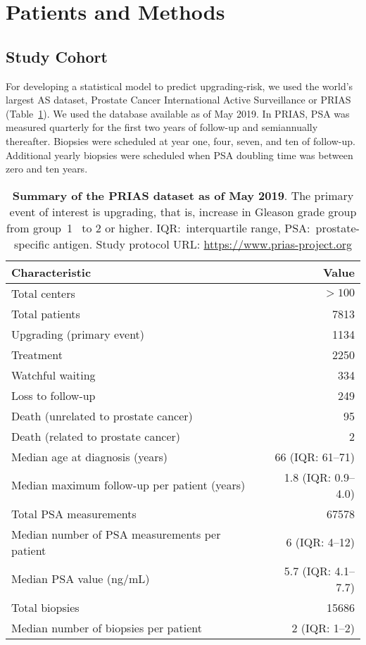 \section{Patients and Methods}
\subsection{Study Cohort}
\label{subsec:cohort}
For developing a statistical model to predict upgrading-risk, we used the world's largest AS dataset, Prostate Cancer International Active Surveillance or PRIAS~\citep{bul2013active} (Table~\ref{table:prias_summary}). We used the database available as of May 2019. In PRIAS, PSA was measured quarterly for the first two years of follow-up and semiannually thereafter. Biopsies were scheduled at year one, four, seven, and ten of follow-up. Additional yearly biopsies were scheduled when PSA doubling time was between zero and ten years.

\begin{table}
\small\sf\centering
\caption{\textbf{Summary of the PRIAS dataset as of May 2019}. The primary event of interest is upgrading, that is, increase in Gleason grade group from group~1~\citep{epsteinGG2014} to 2 or higher. IQR:~interquartile range, PSA:~prostate-specific antigen. Study protocol URL: \url{https://www.prias-project.org}}
\label{table:prias_summary}
\begin{tabular}{lr}
\toprule
\textbf{Characteristic} & \textbf{Value}\\
\midrule
Total centers & $> 100$\\
Total patients & 7813\\
Upgrading (primary event) & 1134\\
Treatment & 2250\\
Watchful waiting & 334\\
Loss to follow-up & 249\\
Death (unrelated to prostate cancer) & 95\\
Death (related to prostate cancer) & 2\\
\midrule
Median age at diagnosis (years) & 66 (IQR: 61--71)\\
Median maximum follow-up per patient (years) &  1.8 (IQR: 0.9--4.0)\\
Total PSA measurements & 67578\\
Median number of PSA measurements per patient &  6 (IQR: 4--12)\\
Median PSA value (ng/mL) & 5.7 (IQR: 4.1--7.7)\\
Total biopsies & 15686\\
Median number of biopsies per patient &  2 (IQR: 1--2)\\
\bottomrule
\end{tabular}
\end{table}

